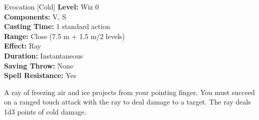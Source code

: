 {Evocation [Cold]}
{
	\textbf{Level:}
	Wiz 0\\
	\textbf{Components:}
	V, S\\
	\textbf{Casting Time:}
	1 standard action\\
	\textbf{Range:}
	Close (7.5 m + 1.5 m/2 levels)\\
	\textbf{Effect:}
	Ray\\
	\textbf{Duration:}
	Instantaneous\\
	\textbf{Saving Throw:}
	None\\
	\textbf{Spell Resistance:}
	Yes\\
}
{
	A ray of freezing air and ice projects from your pointing finger. You must succeed on a ranged touch attack with the ray to deal damage to a target. The ray deals 1d3 points of cold damage.

}
